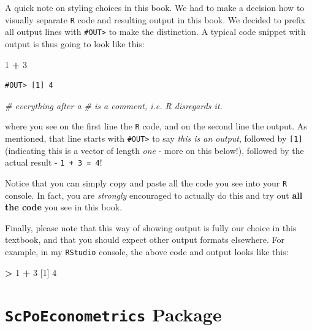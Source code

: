 \documentclass[]{book}
\newenvironment{Shaded}{\begin{snugshade}}{\end{snugshade}}
\newcommand{\DecValTok}[1]{\textcolor[rgb]{0.00,0.00,0.81}{#1}}
\newcommand{\StringTok}[1]{\textcolor[rgb]{0.31,0.60,0.02}{#1}}
\newcommand{\CommentTok}[1]{\textcolor[rgb]{0.56,0.35,0.01}{\textit{#1}}}
\newcommand{\OperatorTok}[1]{\textcolor[rgb]{0.81,0.36,0.00}{\textbf{#1}}}
\newcommand{\NormalTok}[1]{#1}
\begin{document}
A quick note on styling choices in this book. We had to make a decision
how to visually separate \texttt{R} code and resulting output in this
book. We decided to prefix all output lines with
\texttt{\#OUT\textgreater{}} to make the distinction. A typical code
snippet with output is thus going to look like this:

\begin{Shaded}
\begin{Highlighting}[]
\DecValTok{1} \OperatorTok{+}\StringTok{ }\DecValTok{3}
\end{Highlighting}
\end{Shaded}

\begin{verbatim}
#OUT> [1] 4
\end{verbatim}

\begin{Shaded}
\begin{Highlighting}[]
\CommentTok{# everything after a # is a comment, i.e. R disregards it.}
\end{Highlighting}
\end{Shaded}

where you see on the first line the \texttt{R} code, and on the second
line the output. As mentioned, that line starts with
\texttt{\#OUT\textgreater{}} to say \emph{this is an output}, followed
by \texttt{{[}1{]}} (indicating this is a vector of length \emph{one} -
more on this below!), followed by the actual result -
\texttt{1\ +\ 3\ =\ 4}!

Notice that you can simply copy and paste all the code you see into your
\texttt{R} console. In fact, you are \emph{strongly} encouraged to
actually do this and try out \textbf{all the code} you see in this book.

Finally, please note that this way of showing output is fully our choice
in this textbook, and that you should expect other output formats
elsewhere. For example, in my \texttt{RStudio} console, the above code
and output looks like this:

\begin{Shaded}
\begin{Highlighting}[]
\OperatorTok{>}\StringTok{ }\DecValTok{1} \OperatorTok{+}\StringTok{ }\DecValTok{3}
\NormalTok{[}\DecValTok{1}\NormalTok{] }\DecValTok{4}
\end{Highlighting}
\end{Shaded}

\section{\texorpdfstring{\texttt{ScPoEconometrics}
Package}{ScPoEconometrics Package}}\label{install-package}
\end{document}
